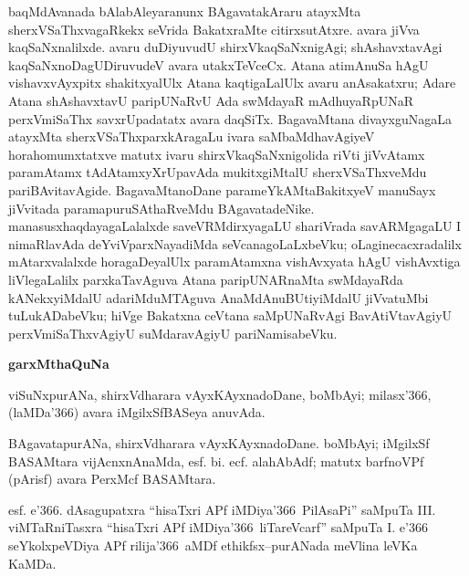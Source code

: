 baqMdAvanada bAlabAleyaranunx BAgavatakAraru atayxMta sherxVSaThxvagaRkekx seVrida BakatxraMte citirxsutAtxre. avara jiVva kaqSaNxnalilxde. avaru duDiyuvudU shirxVkaqSaNxnigAgi; shAshavxtavAgi kaqSaNxnoDagUDiruvudeV avara utakxTeVceCx. Atana atimAnuSa hAgU vishavxvAyxpitx shakitxyalUlx Atana kaqtigaLalUlx avaru anAsakatxru; Adare Atana shAshavxtavU paripUNaRvU Ada swMdayaR mAdhuyaRpUNaR perxVmiSaThx savxrUpadatatx avara daqSiTx. BagavaMtana divayxguNagaLa atayxMta sherxVSaThxparxkAragaLu ivara saMbaMdhavAgiyeV hora\break\-homumxtatxve matutx ivaru shirxVkaqSaNxnigolida riVti jiVvAtamx paramAtamx tAdAtamxyX\-rUpa\-vAda mukitxgiMtalU sherxVSaThxveMdu pariBAvitavAgide. BagavaMtanoDane parameYkAMta\break BakitxyeV manuSayx jiVvitada paramapuruSAthaRveMdu BAgavatadeNike. manasusx\break haqdayagaLalalxde saveVRMdirxyagaLU shariVrada savARMgagaLU I nimaRlavAda deYviV\-parxNayadiMda seVcanagoLaLxbeVku; oLaginecacxradalilx mAtarxvalalxde horagaDeyalUlx para\-mAtamxna vishAvxyata hAgU vishAvxtiga liVlegaLalilx parxkaTavAguva Atana paripUNARnaMta swMdayaRda kANekxyiMdalU adariMduMTAguva AnaMdAnuBUtiyiMdalU jiVvatuMbi tuLukADabeVku; hiVge Bakatxna ceVtana saMpUNaRvAgi BavAtiVtavAgiyU perxVmiSaThxvAgiyU suMdaravAgiyU pariNamisabeVku. 

\theendnotes

\vskip 1cm

\begin{center}
{\bf garxMthaQuNa}
\end{center}

\smallskip
viSuNxpurANa, shirxVdharara vAyxKAyxnadoDane, boMbAyi; milasx\char'366, (laMDa\char'366) avara iMgilxSfBASeya anuvAda.

\smallskip
BAgavatapurANa, shirxVdharara vAyxKAyxnadoDane. boMbAyi; iMgilxSf BASAMtara vijAcnxnAnaMda, esf. bi. ecf. alahAbAdf; matutx barfnoVPf (pArisf) avara PerxMcf BASAMtara.

\smallskip
esf. e\char'366. dAsagupatxra ``hisaTxri APf iMDiya\char'366\ PilAsaPi'' saMpuTa {\rm III.} viMTaRniTasxra ``hisaTxri APf iMDiya\char'366\ liTareVcarf'' saMpuTa {\rm I.} e\char'366 seYkolxpeVDiya APf rilija\char'366\ aMDf ethikfsx--purANada meVlina leVKa KaMDa.
